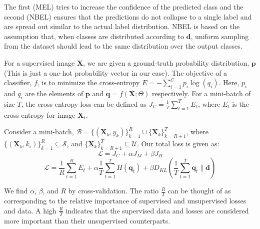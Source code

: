 The first (MEL) tries to increase the confidence of the predicted class and the second (NBEL)
ensures that the predictions do not collapse to a single label and are spread out similar to
the actual label distribution. NBEL is based on the assumption that, when classes are distributed
according to $\mathbf{d}$, uniform sampling from the dataset should lead to the same distribution
over the output classes.

For a supervised image $\mathbf X$, we are given a ground-truth probability distribution, $\mathbf{p}$ (This is
just a one-hot probability vector in our case). The objective of a classifier, $f$, is to minimize the
cross-entropy $E = -\sum_{i=1}^{C}p_i \log(q_i)$. Here, $p_i$ and $q_i$
are the elements of $\mathbf{p}$ and $\mathbf{q} = f(\mathbf{X}; \Theta)$ respectively. For a
mini-batch of size $T$, the cross-entropy loss can be defined as $J_C = \frac{1}{T} \sum_{t=1}^{T}
E_t$, where $E_t$ is the cross-entropy for image $\mathbf{X}_t$.

Consider a mini-batch, $\mathcal{B} =
\{(\mathbf{X}_k, y_k)\}_{k=1}^R \cup \{\mathbf{X}_k\}_{k=R+1}^T$, where $\{(\mathbf{X}_k,
k_i)\}_{k=1}^{R} \subseteq \mathcal{S}$, and $\{\mathbf{X}_k\}_{k=R+1}^{T} \subseteq \mathcal{U}$. Our total loss
is given as:
\begin{equation}
	\mathcal{L} = J_C + \alpha J_M + \beta J_B
\end{equation}
\begin{equation}
	\mathcal{L} = \frac{1}{R} \sum_{t=1}^{R} E_t + \alpha \frac{1}{T}\sum_{t=1}^{T}H(\mathbf{q}_t) +
	\beta D_{KL}(\frac{1}{T}\sum_{t=1}^{T}\mathbf{q}_t \lVert \mathbf{d})
\end{equation}


We find $\alpha$, $\beta$, and $R$ by cross-validation. The ratio $\frac{R}{T}$ can be thought of as
corresponding to the relative importance of supervised and unsupervised losses and data. A high
$\frac{R}{T}$ indicates that the supervised data and losses are considered more important than their
unsupervised counterparts. 


